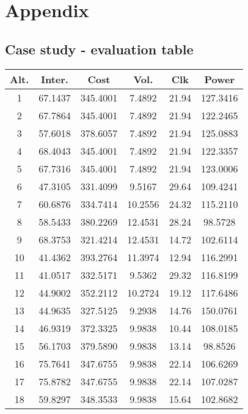 \appendix
\chapter{Appendix}

\renewcommand\thesection{\Roman{section}}
\fancyhead[LO]{\bfseries\rightmark}     %

\section{Case study - evaluation table}
\label{apdx:prom804}
\begin{center}
\begin{footnotesize}
\begin{tabular}{|c|ccccc|}
\hline
Alt. & Inter. & Cost & Vol. & Clk & Power\\
\hline
1 & 67.1437 & 345.4001 & 7.4892 & 21.94 & 127.3416 \\
2 & 67.7864 & 345.4001 & 7.4892 & 21.94 & 122.2465 \\
3 & 57.6018 & 378.6057 & 7.4892 & 21.94 & 125.0883 \\
4 & 68.4043 & 345.4001 & 7.4892 & 21.94 & 122.3357 \\
5 & 67.7316 & 345.4001 & 7.4892 & 21.94 & 123.0006 \\
6 & 47.3105 & 331.4099 & 9.5167 & 29.64 & 109.4241 \\
7 & 60.6876 & 334.7414 & 10.2556 & 24.32 & 115.2110 \\
8 & 58.5433 & 380.2269 & 12.4531 & 28.24 & 98.5728 \\
9 & 68.3753 & 321.4214 & 12.4531 & 14.72 & 102.6114 \\
10 & 41.4362 & 393.2764 & 11.3974 & 12.94 & 116.2991 \\
11 & 41.0517 & 332.5171 & 9.5362 & 29.32 & 116.8199 \\
12 & 44.9002 & 352.2112 & 10.2724 & 19.12 & 117.6486 \\
13 & 44.9635 & 327.5125 & 9.2938 & 14.76 & 150.0761 \\
14 & 46.9319 & 372.3325 & 9.9838 & 10.44 & 108.0185 \\
15 & 56.1703 & 379.5890 & 9.9838 & 13.14 & 98.8526 \\
16 & 75.7641 & 347.6755 & 9.9838 & 22.14 & 106.6269 \\
17 & 75.8782 & 347.6755 & 9.9838 & 22.14 & 107.0287 \\
18 & 59.8297 & 348.3533 & 9.9838 & 15.64 & 102.8682 \\

\end{tabular}
\end{footnotesize}
\end{center}
